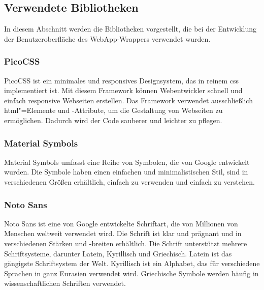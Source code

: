 \subsection{Verwendete Bibliotheken}

In diesem Abschnitt werden die Bibliotheken vorgestellt, die bei der Entwicklung der Benutzeroberfläche des WebApp-Wrappers verwendet wurden.

\subsubsection{PicoCSS}

PicoCSS ist ein minimales und responsives Designsystem, das in reinem \ac{css} implementiert ist.
Mit diesem Framework können Webentwickler schnell und einfach responsive Webseiten erstellen.
Das Framework verwendet ausschließlich \acs{html}"=Elemente und -Attribute, um die Gestaltung von Webseiten zu ermöglichen.
Dadurch wird der Code sauberer und leichter zu pflegen.
\cite{pico}

\subsubsection{Material Symbols}

Material Symbols umfasst eine Reihe von Symbolen, die von Google entwickelt wurden.
Die Symbole haben einen einfachen und minimalistischen Stil, sind in verschiedenen Größen erhältlich, einfach zu verwenden und einfach zu verstehen.
\cite{symbols}

\subsubsection{Noto Sans}

Noto Sans ist eine von Google entwickelte Schriftart, die von Millionen von Menschen weltweit verwendet wird.
Die Schrift ist klar und prägnant und in verschiedenen Stärken und -breiten erhältlich.
Die Schrift unterstützt mehrere Schriftsysteme, darunter Latein, Kyrillisch und Griechisch.
Latein ist das gängigste Schriftsystem der Welt.
Kyrillisch ist ein Alphabet, das für verschiedene Sprachen in ganz Eurasien verwendet wird.
Griechische Symbole werden häufig in wissenschaftlichen Schriften verwendet.
\cite{noto}
